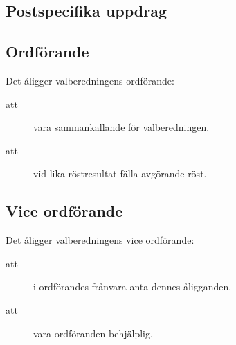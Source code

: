 \documentclass[a4paper]{article}
\begin{document}
\begin{foreningenv}{\forening{}}
    \section{Postspecifika uppdrag}
    \subsection{Ordförande}
    Det åligger valberedningens ordförande:
    \begin{description}
        \item[att] vara sammankallande för valberedningen.
        \item[att] vid lika röstresultat fälla avgörande röst.
    \end{description}
    
    \subsection{Vice ordförande}
    Det åligger valberedningens vice ordförande:
    \begin{description}
        \item[att] i ordförandes frånvara anta dennes åligganden.
        \item[att] vara ordföranden behjälplig.
    \end{description}
\end{foreningenv}
\end{document}
